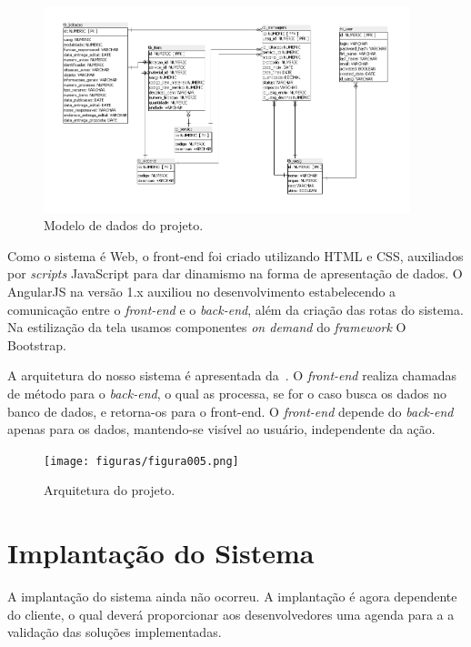 \begin{figure}
	\includegraphics[width=0.95\textwidth]{figuras/bdAtualizado.png}
	\caption{Modelo de dados do projeto.}
	\label{Figura007}
\end{figure}

Como o sistema é Web, o front-end foi criado utilizando  HTML e CSS, auxiliados por \textit{scripts} JavaScript para dar dinamismo na forma de apresentação de dados.
O AngularJS na versão 1.x auxiliou no desenvolvimento estabelecendo a comunicação entre o \textit{front-end} e o \textit{back-end}, além da criação das rotas do sistema.
Na estilização da tela usamos componentes \textit{on demand} do \textit{framework} O Bootstrap.

A arquitetura do nosso sistema é apresentada da~.
O \textit{front-end} realiza chamadas de método para o \textit{back-end}, o qual as processa, se for o caso busca os dados no banco de dados, e retorna-os para o front-end.
O \textit{front-end} depende do \textit{back-end} apenas para os dados, mantendo-se visível ao usuário, independente da ação.

\begin{figure}
    \centering
    \texttt{[image: figuras/figura005.png]}
    \caption{Arquitetura do projeto.}
    \label{Figura005}
\end{figure}

\section{Implantação do Sistema}

A implantação do sistema ainda não ocorreu.
A implantação é agora dependente do cliente, o qual deverá proporcionar aos desenvolvedores uma agenda para a a validação das soluções implementadas.